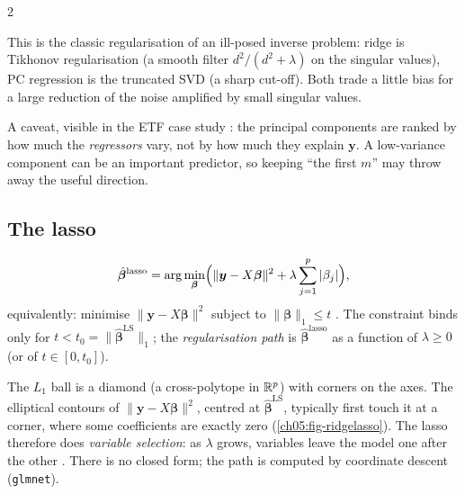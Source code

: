 \begin{paracol}{2}
\begin{intuition}
This is the classic regularisation of an ill-posed inverse problem: ridge is Tikhonov regularisation (a smooth
filter $d^2/(d^2+\lambda)$ on the singular values), PC regression is the truncated SVD (a sharp cut-off). Both trade a
little bias for a large reduction of the noise amplified by small singular values.
\end{intuition}

A caveat, visible in the ETF case study : the principal components are ranked by how much the
\emph{regressors} vary, not by how much they explain $\bm y$. A low-variance component can be an important predictor,
so keeping ``the first $m$'' may throw away the useful direction.

\subsection{The lasso}
\begin{definition}[Lasso]
\[
  \hat{\bm\beta}^{\text{lasso}}=\arg\min_{\bm\beta}\Bigl(\|\bm y-X\bm\beta\|^2+\lambda\sum_{j=1}^p|\beta_j|\Bigr),
\]
equivalently: minimise $\|\bm y-X\bm\beta\|^2$ subject to $\|\bm\beta\|_1\le t$ . The constraint binds only for
$t<t_0=\|\hat{\bm\beta}^{\text{LS}}\|_1$; the \emph{regularisation path} is $\hat{\bm\beta}^{\text{lasso}}$ as a function of $\lambda\ge0$ (or of
$t\in[0,t_0]$).
\end{definition}
The $L_1$ ball is a diamond (a cross-polytope in $\mathbb{R}^p$) with corners on the axes. The elliptical contours of
$\|\bm y-X\bm\beta\|^2$, centred at $\hat{\bm\beta}^{\text{LS}}$, typically first touch it at a corner, where some coefficients are exactly
zero  (\cref{ch05:fig-ridgelasso}). The lasso therefore does \emph{variable selection}: as $\lambda$ grows,
variables leave the model one after the other . There is no closed form; the path is computed by
coordinate descent (\texttt{glmnet}).


\end{paracol}
